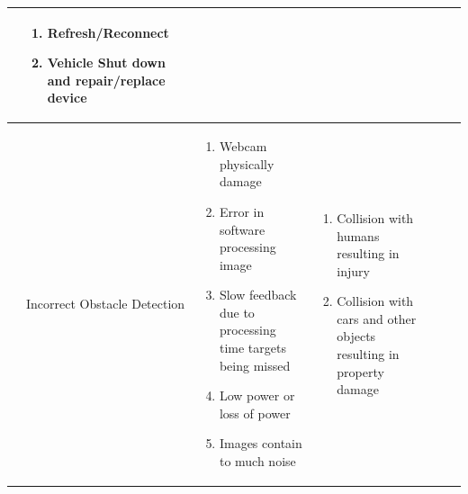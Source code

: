 \documentclass [10pt]{article}
\begin{document}
{{\begin{minipage}{\textwidth}
\begin{longtable}{ |p{ }  | p{ } |  p{ } |  p{ } | p{ } | p{ } |  p{ }|}
    
    & \cellcolor{tableCell}\begin{minipage}{.24 \columnwidth} 
                \vspace{2mm}
                \begin{enumerate}
                    \item Refresh/Reconnect 
                    \item Vehicle Shut down and repair/replace device\vspace {1mm}
                \end{enumerate}
        \end{minipage} \\ \hline
    
   
    
    
    
    \cellcolor{subsectionC}
    &  \begin{minipage} {.19\columnwidth}
            \begin{center}Incorrect  Obstacle Detection \end{center}
        \end{minipage} 
    & \begin{minipage}{.22\textwidth} 
        \vspace{1mm}
                \begin{enumerate}
                    \item Webcam physically damage
                    \item Error in software processing image
                    \item Slow feedback due to processing time targets being missed
                    \item Low power or loss of power
                    \item Images contain to much noise\vspace {1mm}
                \end{enumerate}
        \end{minipage}
    & \begin{minipage}{.22\textwidth} 
                \vspace{2mm}
                \begin{enumerate}
                    \item Collision with humans resulting in injury
                    \item Collision with cars and other objects resulting in property damage
                \end{enumerate}
        \end{minipage}
    & \begin{minipage}{.18\textwidth} 

\end{minipage}
\end{longtable}
\end{minipage}}}
\end{document}
